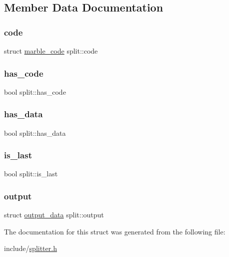 \subsection{Member Data Documentation}
\mbox{\label{structsplit_a8fc2329ce8e3049edfe903fdca076a17}} 
\subsubsection{\texorpdfstring{code}{code}}
{\footnotesize\ttfamily struct \hyperlink{structmarble__code}{marble\+\_\+code} split\+::code}

\mbox{\label{structsplit_acc437a097a9733aa0b7c591ec784b271}} 
\subsubsection{\texorpdfstring{has\+\_\+code}{has\_code}}
{\footnotesize\ttfamily bool split\+::has\+\_\+code}

\mbox{\label{structsplit_ae2277765e4758fe975c5530dd814c849}} 
\subsubsection{\texorpdfstring{has\+\_\+data}{has\_data}}
{\footnotesize\ttfamily bool split\+::has\+\_\+data}

\mbox{\label{structsplit_a13efd7b839008fc3e019b1422fe8ff15}} 
\subsubsection{\texorpdfstring{is\+\_\+last}{is\_last}}
{\footnotesize\ttfamily bool split\+::is\+\_\+last}

\mbox{\label{structsplit_a3efed1338c7ccad093d30c6d94269b6a}} 
\subsubsection{\texorpdfstring{output}{output}}
{\footnotesize\ttfamily struct \hyperlink{structoutput__data}{output\+\_\+data} split\+::output}



The documentation for this struct was generated from the following file\+:\begin{DoxyCompactItemize}
\item 
include/\hyperlink{splitter_8h}{splitter.\+h}\end{DoxyCompactItemize}

